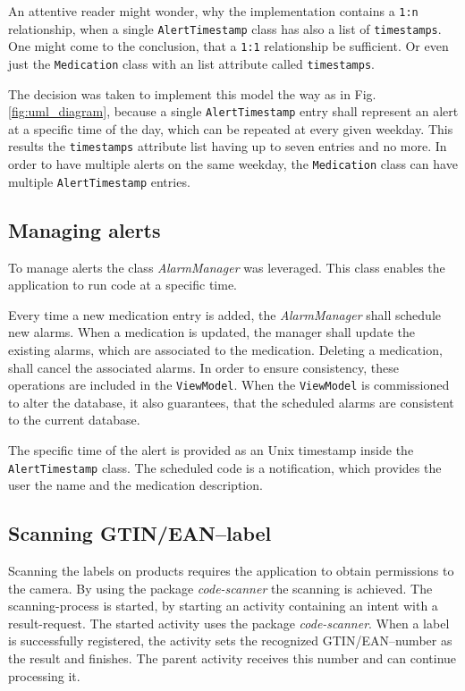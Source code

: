 \documentclass[conference]{IEEEtran}
\begin{document}
An attentive reader might wonder, why the implementation contains a \texttt{1:n} relationship, when a single
\texttt{AlertTimestamp} class has also a list of \texttt{timestamps}. One might come to the conclusion, that a
\texttt{1:1} relationship be sufficient. Or even just the \texttt{Medication} class with an list attribute called
\texttt{timestamps}.

The decision was taken to implement this model the way as in Fig. \ref{fig:uml_diagram}, because a single
\texttt{AlertTimestamp} entry shall represent an alert at a specific time of the day, which can be repeated
at every given weekday. This results the \texttt{timestamps} attribute list having up to seven entries and no
more. In order to have multiple alerts on the same weekday, the \texttt{Medication} class can have multiple 
\texttt{AlertTimestamp} entries.

\subsection{Managing alerts}
To manage alerts the class \textit{AlarmManager} \cite{alarmmanager} was leveraged. This class enables the
application to run code at a specific time.

Every time a new medication entry is added, the \textit{AlarmManager} shall schedule new alarms. When a
medication is updated, the manager shall update the existing alarms, which are associated to the
medication. Deleting a medication, shall cancel the associated alarms. In order to ensure consistency, these
operations are included in the \texttt{ViewModel}. When the \texttt{ViewModel} is commissioned to alter the 
database, it also guarantees, that the scheduled alarms are consistent to the current database.

The specific time of the alert is provided as an Unix timestamp inside the \texttt{AlertTimestamp} class.
The scheduled code is a notification, which provides the user the name and the medication description.


\subsection{Scanning GTIN/EAN--label}
Scanning the labels on products requires the application to obtain permissions to the camera. By using the package
\textit{code-scanner} \cite{barcode} the scanning is achieved. The scanning-process is started, by 
starting an activity containing an intent with a result-request. The started activity uses the package
\textit{code-scanner}. When a label is successfully registered, the activity sets the recognized GTIN/EAN--number
as the result and finishes. The parent activity receives this number and can continue processing it.
\end{document}
